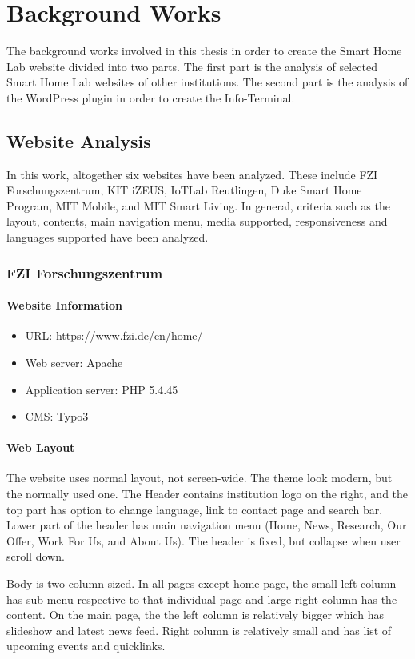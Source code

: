\chapter{Background Works}
The background works involved in this thesis in order to create the Smart Home Lab website divided into two parts. The first part is the analysis of selected Smart Home Lab websites of other institutions. The second part is the analysis of the WordPress plugin in order to create the Info-Terminal.

\section{Website Analysis}
In this work, altogether six websites have been analyzed. These include FZI Forschungszentrum, KIT iZEUS, IoTLab Reutlingen, Duke Smart Home Program, MIT Mobile, and MIT Smart Living. In general, criteria such as the layout, contents, main navigation menu, media supported, responsiveness and languages supported have been analyzed.

\subsection{FZI Forschungszentrum}

\subsubsection*{Website Information}
\begin{itemize}
\item URL: https://www.fzi.de/en/home/
\item Web server: Apache
\item Application server: PHP 5.4.45
\item CMS: Typo3
\end{itemize}

\subsubsection*{Web Layout}
The website uses normal layout, not screen-wide. The theme look modern, but the normally used one. The Header contains institution logo on the right, and the top part has option to change language, link to contact page and search bar. Lower part of the header has main navigation menu (Home, News, Research, Our Offer, Work For Us, and About Us). The header is fixed, but collapse when user scroll down.

Body is two column sized. In all pages except home page, the small left column has sub menu respective to that individual page and large right column has the content. On the main page, the the left column is relatively bigger which has slideshow and latest news feed. Right column is relatively small and has list of upcoming events and quicklinks.

